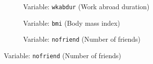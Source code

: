 \begin{figure}[ht]
  \caption{Frequency values for original and synthetic data (DataSynthesizer)}
  \label{fig:ds_variables}
  \centering

\begin{subfigure}{\textwidth}
    \caption{Variable: \texttt{wkabdur} (Work abroad duration)}
    \label{subfig:ds_variable_wkabdur}
\end{subfigure}

\begin{subfigure}{\textwidth}
    \caption{Variable: \texttt{bmi} (Body mass index)}
    \label{subfig:ds_variable_bmi}
\end{subfigure}


\begin{subfigure}{\textwidth}
    \caption{Variable: \texttt{nofriend} (Number of friends)}
    \label{subfig:ds_variable_nofriend}
\end{subfigure}
\end{figure}

